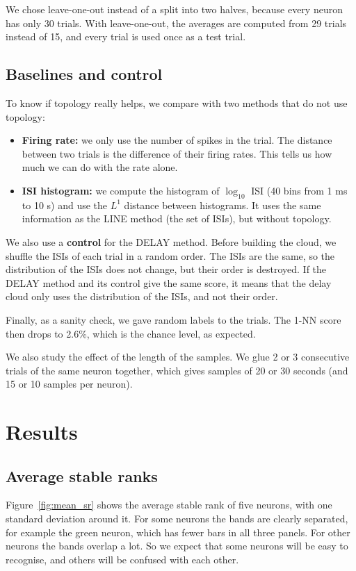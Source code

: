 \documentclass[11pt,a4paper]{article}
\begin{document}
We chose leave-one-out instead of a split into two halves, because every neuron has only 30 trials. With leave-one-out, the averages are computed from 29 trials instead of 15, and every trial is used once as a test trial.

\subsection{Baselines and control}
To know if topology really helps, we compare with two methods that do not use topology:
\begin{itemize}
    \item \textbf{Firing rate:} we only use the number of spikes in the trial. The distance between two trials is the difference of their firing rates. This tells us how much we can do with the rate alone.
    \item \textbf{ISI histogram:} we compute the histogram of $\log_{10}$ ISI (40 bins from 1 ms to 10 s) and use the $L^1$ distance between histograms. It uses the same information as the LINE method (the set of ISIs), but without topology.
\end{itemize}

We also use a \textbf{control} for the DELAY method. Before building the cloud, we shuffle the ISIs of each trial in a random order. The ISIs are the same, so the distribution of the ISIs does not change, but their order is destroyed. If the DELAY method and its control give the same score, it means that the delay cloud only uses the distribution of the ISIs, and not their order.

Finally, as a sanity check, we gave random labels to the trials. The 1-NN score then drops to 2.6\%, which is the chance level, as expected.

We also study the effect of the length of the samples. We glue 2 or 3 consecutive trials of the same neuron together, which gives samples of 20 or 30 seconds (and 15 or 10 samples per neuron).


\section{Results}
\label{sec:results}

\subsection{Average stable ranks}
Figure~\ref{fig:mean_sr} shows the average stable rank of five neurons, with one standard deviation around it. For some neurons the bands are clearly separated, for example the green neuron, which has fewer bars in all three panels. For other neurons the bands overlap a lot. So we expect that some neurons will be easy to recognise, and others will be confused with each other.
\end{document}
